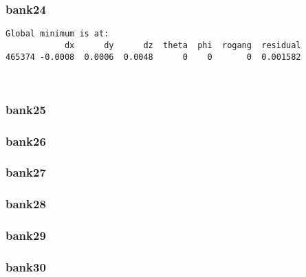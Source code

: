 \documentclass[11pt]{article}
\begin{document}
    \hypertarget{bank24}{%
\subsubsection{bank24}\label{bank24}}

    \begin{Verbatim}[commandchars=\\\{\}]
Global minimum is at:
            dx      dy      dz  theta  phi  rogang  residual
465374 -0.0008  0.0006  0.0048      0    0       0  0.001582
    \end{Verbatim}

    \begin{center}
    \end{center}
    { \hspace*{\fill} \\}
    
    \hypertarget{bank25}{%
\subsubsection{bank25}\label{bank25}}

    \hypertarget{bank26}{%
\subsubsection{bank26}\label{bank26}}

    \hypertarget{bank27}{%
\subsubsection{bank27}\label{bank27}}

    \hypertarget{bank28}{%
\subsubsection{bank28}\label{bank28}}

    \hypertarget{bank29}{%
\subsubsection{bank29}\label{bank29}}

    \hypertarget{bank30}{%
\subsubsection{bank30}\label{bank30}}
\end{document}
